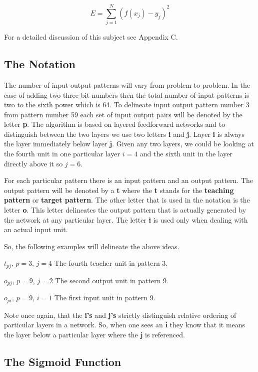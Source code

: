 	$$E = \sum_{j = 1}^N (f(x_j) - y_j)^2$$

	For a detailed discussion of this subject see Appendix C.

\subsection{The Notation}

	The number of input output patterns will vary from problem to
problem. In the case of adding two three bit numbers then the total
number of input patterns is two to the sixth power which is 64.
To delineate input output pattern number 3 from pattern number
59 each set of input output pairs will be denoted by the letter {\bf p}.
The algorithm is based on layered feedforward networks and to
distinguish between the two layers we use two letters {\bf i} and {\bf
j}.  Layer {\bf i} is always the layer immediately below layer {\bf
j}.  Given any two layers, we could be looking at the fourth unit in
one particular layer $i = 4$ and the sixth unit in the layer
directly above it so $j = 6$.

	For each particular pattern there is an input pattern and an
output pattern.  The output pattern will be denoted by a {\bf t} where
the {\bf t} stands for the {\bf teaching pattern} or {\bf target
pattern}.  The other letter that is used in the notation is the letter
{\bf o}.  This letter delineates the output pattern that is actually
generated by the network at any particular layer.  The letter {\bf i}
is used only when dealing with an actual input unit.

	So, the following examples will delineate the above ideas.

	$t_{pj}$, $p = 3$, $j = 4$  The fourth teacher unit in pattern 3.

        $o_{pj}$, $p = 9$, $j = 2$  The second output unit in pattern 9.

        $o_{pi}$, $p = 9$, $i = 1$  The first input unit in pattern 9.

	Note once again, that the {\bf i's} and {\bf j's} strictly
distinguish relative ordering of particular layers in a network.
So, when one sees an {\bf i} they know that it means the layer below a
particular layer where the {\bf j} is referenced.

\subsection{The Sigmoid Function}	

